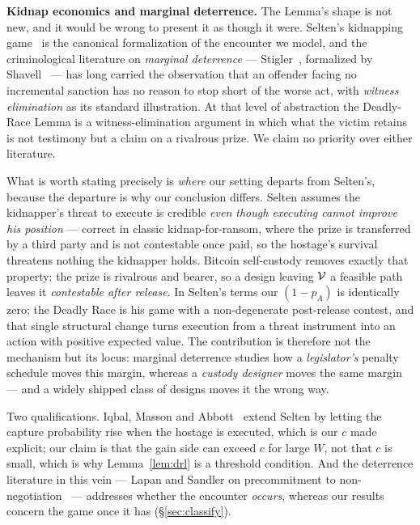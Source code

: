 \textbf{Kidnap economics and marginal deterrence.} The Lemma's shape is not
new, and it would be wrong to present it as though it were. Selten's kidnapping
game~\cite{selten-kidnapping} is the canonical formalization of the encounter we
model, and the criminological literature on \emph{marginal deterrence} ---
Stigler~\cite{stigler-enforcement}, formalized by
Shavell~\cite{shavell-marginal-deterrence} --- has long carried the observation
that an offender facing no incremental sanction has no reason to stop short of the
worse act, with \emph{witness elimination} as its standard illustration. At that
level of abstraction the Deadly-Race Lemma is a witness-elimination argument in
which what the victim retains is not testimony but a claim on a rivalrous prize.
We claim no priority over either literature.

What is worth stating precisely is \emph{where} our setting departs from Selten's,
because the departure is why our conclusion differs. Selten assumes the
kidnapper's threat to execute is credible \emph{even though executing cannot
improve his position} --- correct in classic kidnap-for-ransom, where the prize is
transferred by a third party and is not contestable once paid, so the hostage's
survival threatens nothing the kidnapper holds. Bitcoin self-custody removes
exactly that property: the prize is rivalrous and bearer, so a design leaving
$\mathcal{V}$ a feasible path leaves it \emph{contestable after release}. In Selten's
terms our $(1-p_A)$ is identically zero; the Deadly Race is his game with a
non-degenerate post-release contest, and that single structural change turns
execution from a threat instrument into an action with positive expected value.
The contribution is therefore not the mechanism but its locus: marginal deterrence
studies how a \emph{legislator's} penalty schedule moves this margin, whereas a
\emph{custody designer} moves the same margin --- and a widely shipped class of
designs moves it the wrong way.

Two qualifications. Iqbal, Masson and Abbott~\cite{iqbal-selten-extension} extend
Selten by letting the capture probability rise when the hostage is executed, which
is our $c$ made explicit; our claim is that the gain side can exceed $c$ for large
$W$, not that $c$ is small, which is why Lemma~\ref{lem:drl} is a threshold
condition. And the deterrence literature in this vein --- Lapan and Sandler on
precommitment to non-negotiation~\cite{lapan-sandler-bargain} --- addresses
whether the encounter \emph{occurs}, whereas our results concern the game once it
has (\S\ref{sec:classify}).
